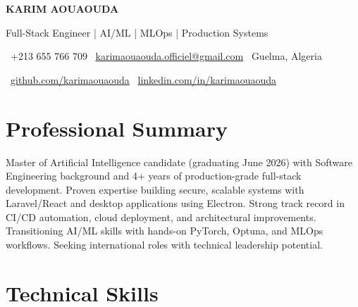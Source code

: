 \documentclass[11pt,a4paper]{article}
\begin{document}
\begin{center}
    {\Large\textbf{\color{darkblue}KARIM AOUAOUDA}}
    
    \vspace{2pt}
    {\color{gray}Full-Stack Engineer | AI/ML | MLOps | Production Systems}
    
    \vspace{8pt}
    \faPhone\ +213 655 766 709 \quad 
    \faEnvelope\ \href{mailto:karimaouaouda.officiel@gmail.com}{karimaouaouda.officiel@gmail.com} \quad
    \faMapMarker\ Guelma, Algeria
    
    \vspace{5pt}
    \faGithub\ \href{https://github.com/karimaouaouda}{github.com/karimaouaouda} \quad
    \faLinkedin\ \href{https://linkedin.com/in/karimaouaouda}{linkedin.com/in/karimaouaouda}
\end{center}

\vspace{8pt}

\section{Professional Summary}

Master of Artificial Intelligence candidate (graduating June 2026) with Software Engineering background and 4+ years of production-grade full-stack development. Proven expertise building secure, scalable systems with Laravel/React and desktop applications using Electron. Strong track record in CI/CD automation, cloud deployment, and architectural improvements. Transitioning AI/ML skills with hands-on PyTorch, Optuna, and MLOps workflows. Seeking international roles with technical leadership potential.

\vspace{6pt}

\section{Technical Skills}
\end{document}
